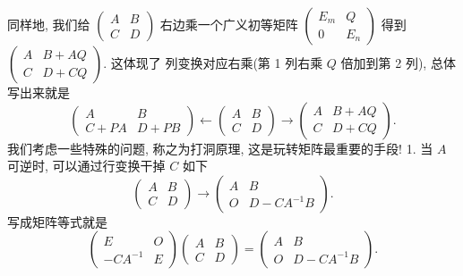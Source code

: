 \documentclass{article}
\begin{document}
同样地, 我们给 $\left(\begin{array}{cc}A & B \\ C & D\end{array}\right)$ 右边乘一个广义初等矩阵 $\left(\begin{array}{cc}E_{m} & Q \\ 0 & E_{n}\end{array}\right)$ 得到 $\left(\begin{array}{cc}A & B+A Q \\ C & D+C Q\end{array}\right) .$ 这体现了
列变换对应右乘(第 1 列右乘 $Q$ 倍加到第 2 列), 总体写出来就是
\begin{equation*}
    \left(\begin{array}{cc}
        A     & B     \\
        C+P A & D+P B
    \end{array}\right) \leftarrow\left(\begin{array}{cc}
        A & B \\
        C & D
    \end{array}\right) \longrightarrow\left(\begin{array}{cc}
        A & B+A Q \\
        C & D+C Q
    \end{array}\right).
\end{equation*}
我们考虑一些特殊的问题, 称之为打洞原理, 这是玩转矩阵{\heiti 最重要}的手段!
1. 当 $A$ 可逆时, 可以通过行变换干掉 $C$ 如下
\begin{equation*}
    \left(\begin{array}{ll}
        A & B \\
        C & D
    \end{array}\right) \longrightarrow\left(\begin{array}{cc}
        A & B            \\
        O & D-C A^{-1} B
    \end{array}\right).
\end{equation*}
写成矩阵等式就是
\begin{equation*}
    \left(\begin{array}{cc}
        E         & O \\
        -C A^{-1} & E
    \end{array}\right)\left(\begin{array}{cc}
        A & B \\
        C & D
    \end{array}\right)=\left(\begin{array}{cc}
        A & B            \\
        O & D-C A^{-1} B
    \end{array}\right).
\end{equation*}
\end{document}
